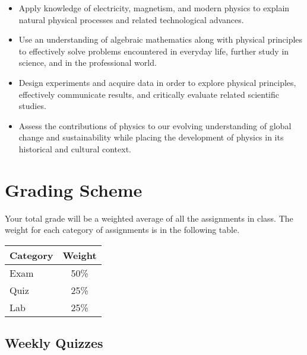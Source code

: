 \documentclass{article}
\begin{document}
%
\begin{itemize}

\item Apply knowledge of electricity, magnetism, and modern physics to explain natural physical processes and related technological advances.

\item Use an understanding of algebraic mathematics along with physical principles to effectively solve problems encountered in everyday life, further study in science, and in the professional world.

\item Design experiments and acquire data in order to explore physical principles, effectively communicate results, and critically evaluate related scientific studies.

\item Assess the contributions of physics to our evolving understanding of global change and sustainability while placing the development of physics in its historical and cultural context.

\end{itemize}





\section{Grading Scheme}

Your total grade will be a weighted average of all the assignments in class. The weight for each category of assignments is in the following table.

\begin{center}

\renewcommand{\arraystretch}{1.5}
\renewcommand{\tabcolsep}{0.2cm}

\begin{tabular}{lc}
\hline
\textbf{Category} & \textbf{Weight} \\
\hline

Exam & 50\% \\

Quiz & 25\% \\

Lab & 25\% \\

\hline
\end{tabular}

\end{center}

\subsection{Weekly Quizzes%
  \label{weekly-quizzes}%
}
\end{document}
